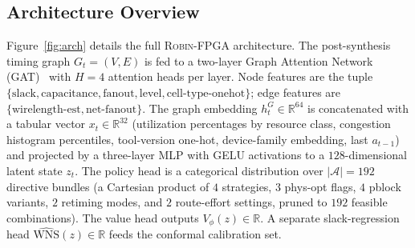 \documentclass[journal,onecolumn=false]{IEEEtran}
\begin{document}
\subsection{Architecture Overview}
Figure~\ref{fig:arch} details the full \textsc{Robin-FPGA} architecture. The post-synthesis timing graph $G_t = (V, E)$ is fed to a two-layer Graph Attention Network (GAT)~\cite{velickovic2018gat} with $H=4$ attention heads per layer. Node features are the tuple $\{\text{slack},\text{capacitance},\text{fanout},\text{level},\text{cell-type-onehot}\}$; edge features are $\{\text{wirelength-est},\text{net-fanout}\}$. The graph embedding $h^{G}_t \in \mathbb{R}^{64}$ is concatenated with a tabular vector $x_t \in \mathbb{R}^{32}$ (utilization percentages by resource class, congestion histogram percentiles, tool-version one-hot, device-family embedding, last $a_{t-1}$) and projected by a three-layer MLP with GELU activations to a $128$-dimensional latent state $z_t$. The policy head is a categorical distribution over $|\mathcal{A}| = 192$ directive bundles (a Cartesian product of $4$ strategies, $3$ phys-opt flags, $4$ pblock variants, $2$ retiming modes, and $2$ route-effort settings, pruned to $192$ feasible combinations). The value head outputs $V_\phi(z) \in \mathbb{R}$. A separate slack-regression head $\widehat{\mathrm{WNS}}(z) \in \mathbb{R}$ feeds the conformal calibration set.
\end{document}
